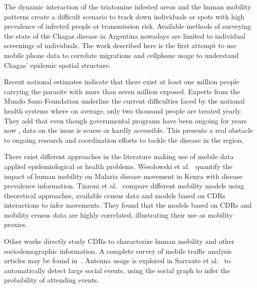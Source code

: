 The dynamic interaction of the triatomine infested areas and the human mobility patterns create a difficult scenario to track down individuals or spots with high prevalence of infected people or transmission risk. Available methods of surveying the state of the Chagas disease in Argentina nowadays are limited to individual screenings of individuals. The work described here is the first attempt to use mobile phone data to correlate migrations and cellphone usage to understand Chagas’ epidemic spatial structure.

Recent national estimates indicate that there exist at least one million people carrying the parasite with more than seven million exposed. Experts from the Mundo Sano Foundation underline the current difficulties faced by the national health systems where on average, only two thousand people are treated yearly. They add that even though governmental programs have been ongoing for years now \cite{plan_nacional_chagas}, data on the issue is scarse or hardly accessible. This presents a real obstacle to ongoing research and coordination efforts to tackle the disease in the region.

There exist different approaches in the literature making use of mobile data applied epidemiological or health problems.
Wesolowski et al.~\cite{wesolowski2012quantifying} quantify the impact of human mobility on Malaria disease movement in Kenya with disease prevalence information.
Tizzoni et al.~\cite{tizzoni2014use} compare different mobility models using theoretical approaches, available census data and models based on CDRs interactions to infer movements. They found that the models based on CDRs and mobility census data are highly correlated, illustrating their use as mobility proxies.

Other works directly study CDRs to characterize human mobility and other
sociodemographic information. A complete survey of mobile traffic analysis articles may be found in~\cite{naboulsi2015mobile}. Antenna usage is explored in Sarraute et al.~\cite{sarraute2015socialevents} to automatically detect large social events, using the social graph to infer the probability of attending events.
